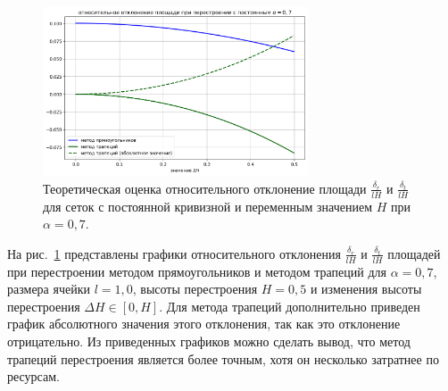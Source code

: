 \begin{figure}[h]
\onelinecaptionstrue
\centering
\includegraphics[width=0.7\textwidth]{pics/text_1_remesh_2d/rel_dev_for_const_alpha07.png}
\caption{Теоретическая оценка относительного отклонение площади $\frac{\delta_r}{lH}$ и $\frac{\delta_t}{lH}$ для сеток с постоянной кривизной и переменным значением $H$ при $\alpha = 0,7$.}
\label{fig:text_1_remesh_2d_rel_dev_for_const_alpha07}
\end{figure}

На рис.~\ref{fig:text_1_remesh_2d_rel_dev_for_const_alpha07} представлены графики относительного отклонения $\frac{\delta_r}{lH}$ и $\frac{\delta_t}{lH}$ площадей при перестроении методом прямоугольников и методом трапеций для $\alpha = 0,7$, размера ячейки $l = 1,0$, высоты перестроения $H = 0,5$ и изменения высоты перестроения $\Delta H \in [0, H]$.
Для метода трапеций дополнительно приведен график абсолютного значения этого отклонения, так как это отклонение отрицательно.
Из приведенных графиков можно сделать вывод, что метод трапеций перестроения является более точным, хотя он несколько затратнее по ресурсам.
